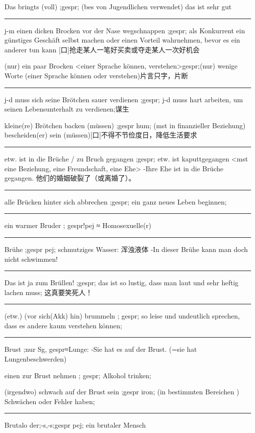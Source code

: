 Das bringts (voll) ;gespr; (bes von Jugendlichen verwendet) das ist sehr gut

\noindent\rule{\textwidth}{1pt} 
j-m einen dicken Brocken vor der Nase wegschnappen ;gespr; als Konkurrent ein günstiges Geschäft selbst machen oder einen Vorteil wahrnehmen, bevor es ein anderer tun kann [口]抢走某人一笔好买卖或夺走某人一次好机会

(nur) ein paar Brocken \textless einer Sprache können, verstehen\textgreater  gespr;(nur) wenige Worte (einer Sprache können oder verstehen)片言只字，片断

\noindent\rule{\textwidth}{1pt} 
j-d muss sich seine Brötchen sauer verdienen ;gespr; j-d muss hart arbeiten, um seinen Lebensunterhalt zu verdienen;谋生

kleine(re) Brötchen backen (müssen) ;gespr hum; (mst in finanzieller Beziehung) bescheiden(er) sein (müssen)[口]不得不节俭度日，降低生活要求

\noindent\rule{\textwidth}{1pt} 
etw. ist in die Brüche / zu Bruch gegangen ;gespr; etw. ist kaputtgegangen \textless mst eine Beziehung, eine Freundschaft, eine Ehe\textgreater 
-Ihre Ehe ist in die Brüche gegangen. 他们的婚姻破裂了（或离婚了）。

\noindent\rule{\textwidth}{1pt} 
alle Brücken hinter sich abbrechen ;gespr; ein ganz neues Leben beginnen;

\noindent\rule{\textwidth}{1pt} 
ein warmer Bruder ; gespr!pej ≈ Homosexuelle(r)

\noindent\rule{\textwidth}{1pt} 
Brühe ;gespr pej; schmutziges Wasser: 浑浊液体
-In dieser Brühe kann man doch nicht schwimmen!

\noindent\rule{\textwidth}{1pt} 
Das ist ja zum Brüllen! ;gespr; das ist so lustig, dass man laut und sehr heftig lachen muss; 这真要笑死人！

\noindent\rule{\textwidth}{1pt} 
(etw.) (vor sich(Akk) hin) brummeln ; gespr; so leise und undeutlich sprechen, dass es andere kaum verstehen können; 

\noindent\rule{\textwidth}{1pt} 
Brust ;nur Sg, gespr≈Lunge:
-Sie hat es auf der Brust. (=sie hat Lungenbeschwerden) 

einen zur Brust nehmen ; gespr; Alkohol trinken;

(irgendwo) schwach auf der Brust sein ;gespr iron; (in bestimmten Bereichen ) Schwächen oder Fehler haben;

\noindent\rule{\textwidth}{1pt} 
Brutalo der;-s,-s;gespr pej; ein brutaler Mensch 

